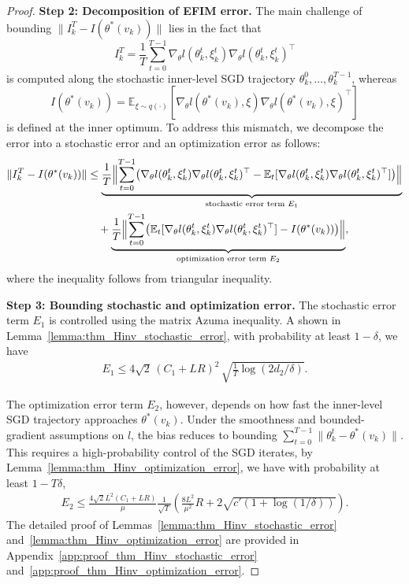 \documentclass[11 pt]{article}
\begin{document}
\begin{proof}
\textbf{Step 2: Decomposition of EFIM error.} 
The main challenge of bounding $\| I_k^T-I(\theta^*(v_k))\|$ lies in the fact that
\[
I_k^{T}=\frac{1}{T}\sum_{t=0}^{T-1}
\nabla_\theta l(\theta_k^{t},\xi_k^t)\nabla_\theta l(\theta_k^{t},\xi_k^t)^\top
\]
is computed along the stochastic inner-level SGD trajectory 
$\theta_k^0,\ldots,\theta_k^{T-1}$, whereas
\[
I(\theta^*(v_k))
= \mathbb{E}_{\xi\sim q(\cdot)}\!\left[ 
\nabla_\theta l(\theta^*(v_k),\xi)
\nabla_\theta l(\theta^*(v_k),\xi)^\top 
\right]
\]
is defined at the inner optimum. To address this mismatch, we decompose the error into a stochastic error and an optimization error as follows:
\begin{align*}
\|I_k^{T} - I(\theta^*(v_k))\|
&\le 
\underbrace{
\frac{1}{T}\Bigl\|
\sum_{t=0}^{T-1}
\bigl(
\nabla_\theta l(\theta_k^{t},\xi_k^t)\nabla_\theta l(\theta_k^{t},\xi_k^t)^\top
-
\mathbb{E}_t[
\nabla_\theta l(\theta_k^{t},\xi_k^t)\nabla_\theta l(\theta_k^{t},\xi_k^t)^\top]
\bigr)
\Bigr\|
}_{\text{stochastic error term $E_1$}}
\\
&\quad+
\underbrace{
\frac{1}{T}\Bigl\|
\sum_{t=0}^{T-1}
\bigl(
\mathbb{E}_t[
\nabla_\theta l(\theta_k^{t},\xi_k^t)\nabla_\theta l(\theta_k^{t},\xi_k^t)^\top]
-
I(\theta^*(v_k))
\bigr)
\Bigr\|
}_{\text{optimization error term $E_2$}},
\end{align*} 
where the inequality follows from triangular inequality.

 \textbf{Step 3: Bounding stochastic and optimization error.}
The stochastic error term $E_1$ is controlled using the matrix Azuma inequality. A shown in Lemma~\ref{lemma:thm_Hinv_stochastic_error},  with probability at least $1-\delta$, we have
\begin{align*}
E_1 \leq 4\sqrt{2}\, (C_1 + LR)^2\, \sqrt{\frac{1}{T}\log\left(2d_2/\delta\right)}.
\end{align*} 

The optimization error term $E_2$, however, depends on how fast the inner-level SGD trajectory approaches 
$\theta^*(v_k)$. Under the smoothness and bounded-gradient assumptions on $l$, the bias reduces to bounding $\sum_{t=0}^{T-1}\|\theta_k^{t} - \theta^*(v_k)\|$. This requires a high-probability control of the SGD iterates, by Lemma~\ref{lemma:thm_Hinv_optimization_error}, we have with probability at least $1-T\delta$,
\begin{align*}
    E_2 \leq \frac{4\sqrt2L^2(C_1+LR)}{\mu}\frac{1}{\sqrt{T}}\left(\frac{8L^2}{\mu^2}R+2\sqrt{c'(1+\log(1/\delta))}\right).
\end{align*}
The detailed proof of Lemmas~\ref{lemma:thm_Hinv_stochastic_error} and~\ref{lemma:thm_Hinv_optimization_error} are provided in Appendix~\ref{app:proof_thm_Hinv_stochastic_error} and~\ref{app:proof_thm_Hinv_optimization_error}.


\end{proof}
\end{document}
